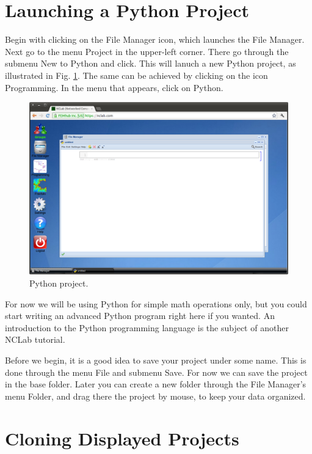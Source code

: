 \documentclass[article,A4,12pt]{llncs}
\begin{document}
\section{Launching a Python Project}

Begin with clicking on the File Manager icon, which launches the File 
Manager. Next go to the menu Project in the upper-left corner. There go 
through the submenu New to Python and click. This will lanuch a new Python 
project, as illustrated in Fig. \ref{fig:python}. The same can be achieved
by clicking on the icon Programming. In the menu that appears, click on 
Python. 

\newpage

\begin{figure}[!ht]
\begin{center}
\includegraphics[width=\textwidth]{img/python.png}
\end{center}
\caption{Python project.}
\label{fig:python}
\end{figure}
\noindent
For now we will be using Python for simple math operations only,
but you could start writing an advanced Python program right 
here if you wanted. An introduction to the Python programming 
language is the subject of another NCLab tutorial.

Before we begin, it is a good idea to save your project under some 
name. This is done through the menu File and submenu Save. For 
now we can save the project in the base folder. Later you can create 
a new folder through the File Manager's menu Folder, and drag there
the project by mouse, to keep your data organized.

\section{Cloning Displayed Projects}
\end{document}
